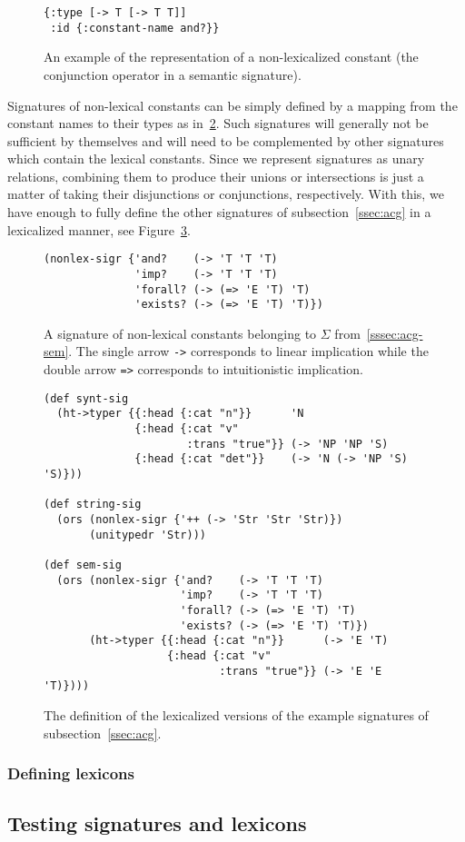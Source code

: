 \begin{figure}
  \centering
  \begin{verbatim}
{:type [-> T [-> T T]]
 :id {:constant-name and?}}
  \end{verbatim}
  \caption{\label{fig:nonlex-const} An example of the representation of
    a non-lexicalized constant (the conjunction operator in a semantic
    signature).}
\end{figure}

Signatures of non-lexical constants can be simply defined by a mapping
from the constant names to their types as
in~\ref{fig:nonlex-sig-impl}. Such signatures will generally not be
sufficient by themselves and will need to be complemented by other
signatures which contain the lexical constants. Since we represent
signatures as unary relations, combining them to produce their unions or
intersections is just a matter of taking their disjunctions or
conjunctions, respectively. With this, we have enough to fully define
the other signatures of subsection~\ref{ssec:acg} in a lexicalized
manner, see Figure~\ref{fig:example-sig-impl}.

\begin{figure}
  \centering
  \begin{verbatim}
(nonlex-sigr {'and?    (-> 'T 'T 'T)
              'imp?    (-> 'T 'T 'T)
              'forall? (-> (=> 'E 'T) 'T)
              'exists? (-> (=> 'E 'T) 'T)})
  \end{verbatim}
  \caption{\label{fig:nonlex-sig-impl} A signature of non-lexical
    constants belonging to $\Sigma$%
    from~\ref{sssec:acg-sem}. The single arrow \texttt{->} corresponds
    to linear implication while the double arrow \texttt{=>} corresponds
    to intuitionistic implication.}
\end{figure}

\begin{figure}
  \centering
  \begin{verbatim}
(def synt-sig
  (ht->typer {{:head {:cat "n"}}      'N
              {:head {:cat "v"
                      :trans "true"}} (-> 'NP 'NP 'S)
              {:head {:cat "det"}}    (-> 'N (-> 'NP 'S) 'S)}))

(def string-sig
  (ors (nonlex-sigr {'++ (-> 'Str 'Str 'Str)})
       (unitypedr 'Str)))

(def sem-sig
  (ors (nonlex-sigr {'and?    (-> 'T 'T 'T)
                     'imp?    (-> 'T 'T 'T)
                     'forall? (-> (=> 'E 'T) 'T)
                     'exists? (-> (=> 'E 'T) 'T)})
       (ht->typer {{:head {:cat "n"}}      (-> 'E 'T)
                   {:head {:cat "v"
                           :trans "true"}} (-> 'E 'E 'T)})))
  \end{verbatim}
  \caption{\label{fig:example-sig-impl} The definition of the
    lexicalized versions of the example signatures of
    subsection~\ref{ssec:acg}.}
\end{figure}

\subsubsection{Defining lexicons}



\subsection{Testing signatures and lexicons}
